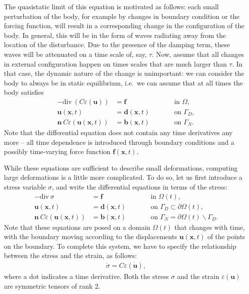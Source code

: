 \documentclass{article}
\renewcommand{\vec}[1]{\mathbf{#1}}
\renewcommand{\div}{\mathrm{div}\ }
\begin{document}
The quasistatic limit of this equation is motivated as follows: each small
perturbation of the body, for example by changes in boundary condition or the
forcing function, will result in a corresponding change in the configuration
of the body. In general, this will be in the form of waves radiating away from
the location of the disturbance. Due to the presence of the damping term,
these waves will be attenuated on a time scale of, say, $\tau$. Now, assume
that all changes in external configuration happen on times scales that are
much larger than $\tau$. In that case, the dynamic nature of the change is
unimportant: we can consider the body to always be in static equilibrium,
i.e.~we can assume that at all times the body satisfies
\begin{align}
  - \div ( C \varepsilon(\vec u)) &= \vec f
  &&\text{in $\Omega$},
  \\
  \vec u(\vec x,t) &= \vec d(\vec x,t)
  \qquad
  &&\text{on $\Gamma_D$},
  \\
  \vec n \ C \varepsilon(\vec u(\vec x,t)) &= \vec b(\vec x,t)
  \qquad
  &&\text{on $\Gamma_N$}.
\end{align}
Note that the differential equation does not contain any time derivatives any
more -- all time dependence is introduced through boundary conditions and a
possibly time-varying force function $\vec f(\vec x,t)$.

While these equations are sufficient to describe small deformations, computing
large deformations is a little more complicated. To do so, let us first
introduce a stress variable $\sigma$, and write the differential equations in
terms of the stress:
\begin{align}
  - \div \sigma &= \vec f
  &&\text{in $\Omega(t)$},
  \\
  \vec u(\vec x,t) &= \vec d(\vec x,t)
  \qquad
  &&\text{on $\Gamma_D\subset\partial\Omega(t)$},
  \\
  \vec n \ C \varepsilon(\vec u(\vec x,t)) &= \vec b(\vec x,t)
  \qquad
  &&\text{on $\Gamma_N=\partial\Omega(t)\backslash\Gamma_D$}.
\end{align}
Note that these equations are posed on a domain $\Omega(t)$ that
changes with time, with the boundary moving according to the
displacements $\vec u(\vec x,t)$ of the points on the boundary. To
complete this system, we have to specify the relationship between the
stress and the strain, as follows:
\begin{align}
  \label{eq:stress-strain}
  \dot\sigma = C \varepsilon (\dot{\vec u}),
\end{align}
where a dot indicates a time derivative. Both the stress $\sigma$ and the
strain $\varepsilon(\vec u)$ are symmetric tensors of rank 2.
\end{document}
